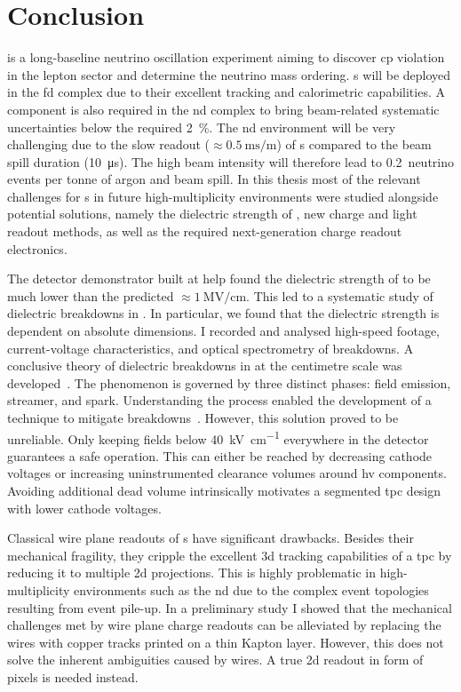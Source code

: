 \chapter{Conclusion}
\label{chap:conclusion}

\dune{} is a long-baseline neutrino oscillation experiment aiming to discover \gls{cp} violation in the lepton sector and determine the neutrino mass ordering.
\lartpc{}s will be deployed in the \gls{fd} complex due to their excellent tracking and calorimetric capabilities.
A \lartpc{} component is also required in the \gls{nd} complex to bring beam-related systematic uncertainties below the required \SI{2}{\percent}.
The \gls{nd} environment will be very challenging due to the slow readout ($\approx \SI{0.5}{\milli\second\per\metre}$) of \lartpc{}s compared to the beam spill duration (\SI{10}{\micro\second}).
The high beam intensity will therefore lead to \num{0.2}~neutrino events per tonne of argon and beam spill.
In this thesis most of the relevant challenges for \lartpc{}s in future high-multiplicity environments were studied alongside potential solutions, namely the dielectric strength of \lar{}, new charge and light readout methods, as well as the required next-generation charge readout electronics.

The \AT{} detector demonstrator built at \gls{help} found the dielectric strength of \lar{} to be much lower than the predicted $\approx \SI{1}{\mega\volt\per\centi\metre}$.
This led to a systematic study of dielectric breakdowns in \lar{}.
In particular, we found that the dielectric strength is dependent on absolute dimensions.
I recorded and analysed high-speed footage, current-voltage characteristics, and optical spectrometry of breakdowns.
A conclusive theory of dielectric breakdowns in \lar{} at the centimetre scale was developed~\cite{breakdown_16}.
The phenomenon is governed by three distinct phases: field emission, streamer, and spark.
Understanding the process enabled the development of a technique to mitigate breakdowns~\cite{latex}.
However, this solution proved to be unreliable.
Only keeping fields below \SI{40}{\kilo\volt\per\centi\metre} everywhere in the detector guarantees a safe operation.
This can either be reached by decreasing cathode voltages or increasing uninstrumented clearance volumes around \gls{hv} components.
Avoiding additional dead \lar{} volume intrinsically motivates a segmented \gls{tpc} design with lower cathode voltages.

Classical wire plane readouts of \lartpc{}s have significant drawbacks.
Besides their mechanical fragility, they cripple the excellent \gls{3d} tracking capabilities of a \gls{tpc} by reducing it to multiple \gls{2d} projections.
This is highly problematic in high-multiplicity environments such as the \dune{} \gls{nd} due to the complex event topologies resulting from event pile-up.
In a preliminary study I showed that the mechanical challenges met by wire plane charge readouts can be alleviated by replacing the wires with copper tracks printed on a thin Kapton layer.
However, this does not solve the inherent ambiguities caused by wires.
A true \gls{2d} readout in form of pixels is needed instead.

